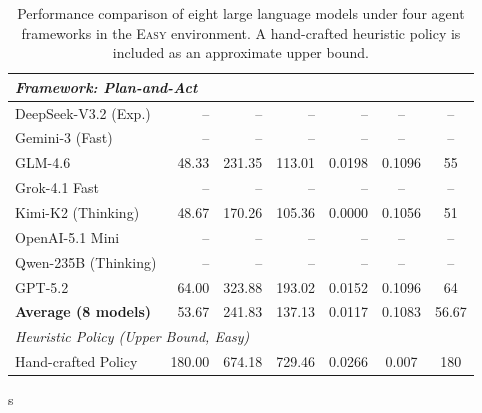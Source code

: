 \begin{table}[t]
{\begin{tabular}{lrrrrcc}
    \multicolumn{7}{l}{\cellcolor{gray!20}\textit{Framework: Plan-and-Act}} \\
    \midrule
    DeepSeek-V3.2 (Exp.) & -- & -- & -- & -- & -- & -- \\
    Gemini-3 (Fast)      & -- & -- & -- & -- & -- & -- \\
    GLM-4.6              & 48.33 & 231.35 & 113.01 & 0.0198 & 0.1096 & 55 \\
    Grok-4.1 Fast        & -- & -- & -- & -- & -- & -- \\
    Kimi-K2 (Thinking)   & 48.67 & 170.26 & 105.36 & 0.0000 & 0.1056 & 51 \\
    OpenAI-5.1 Mini      & -- & -- & -- & -- & -- & -- \\
    Qwen-235B (Thinking) & -- & -- & -- & -- & -- & -- \\
    GPT-5.2              & 64.00 & 323.88 & 193.02 & 0.0152 & 0.1096 & 64 \\
    \midrule
    \textbf{Average (8 models)} & 53.67 & 241.83 & 137.13 & 0.0117 & 0.1083 & 56.67 \\
    \midrule

    \multicolumn{7}{l}{\cellcolor{gray!20}\textit{Heuristic Policy (Upper Bound, Easy)}} \\
    \midrule
    Hand-crafted Policy & 180.00 & 674.18 & 729.46 & 0.0266 & 0.007 & 180 \\
    \bottomrule
    \end{tabular}
    }
    \caption{
    Performance comparison of eight large language models under four agent frameworks in the \textsc{Easy} environment.
    A hand-crafted heuristic policy is included as an approximate upper bound.
    }
    \label{tab:scenario_stats}
    \vspace{-5mm}
\end{table}
s